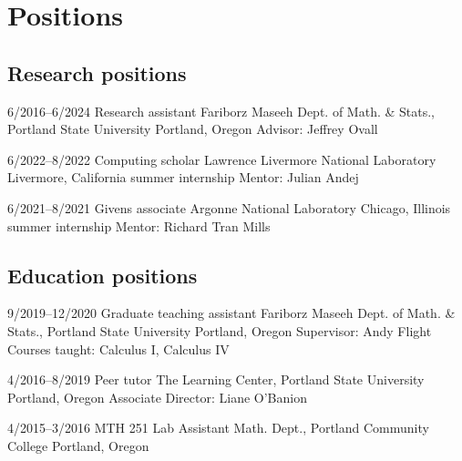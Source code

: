\section{Positions}

\subsection{Research positions}

    \cventry
    {6/2016--6/2024}
    {Research assistant}
    {Fariborz Maseeh Dept. of Math. \& Stats., Portland State University}
    {Portland, Oregon}
    {}
    {Advisor: Jeffrey Ovall}

    \cventry
    {6/2022--8/2022}
    {Computing scholar}
    {Lawrence Livermore National Laboratory}
    {Livermore, California}
    {summer internship}
    {Mentor: Julian Andej}

    \cventry
    {6/2021--8/2021}
    {Givens associate}
    {Argonne National Laboratory}
    {Chicago, Illinois}
    {summer internship}
    {Mentor: Richard Tran Mills}

\subsection{Education positions}

    \cventry
    {9/2019--12/2020}
    {Graduate teaching assistant}
    {Fariborz Maseeh Dept. of Math. \& Stats., Portland State University}
    {Portland, Oregon}
    {}
    {Supervisor: Andy Flight\\
    Courses taught: Calculus I, Calculus IV}

    \cventry
    {4/2016--8/2019}
    {Peer tutor}
    {The Learning Center, Portland State University}
    {Portland, Oregon}
    {}
    {Associate Director: Liane O'Banion}

    \cventry
    {4/2015--3/2016}
    {MTH 251 Lab Assistant}
    {Math. Dept., Portland Community College}
    {Portland, Oregon}
    {}
    {}
